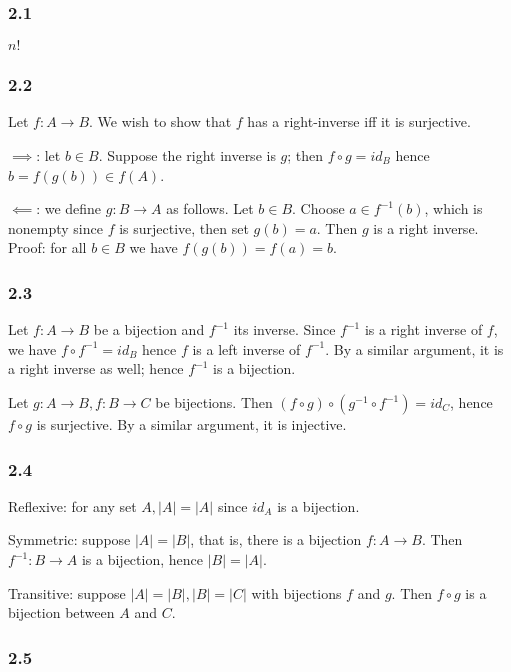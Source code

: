 \documentclass{article}
\begin{document}
\subsubsection*{2.1}

$n!$

\subsubsection*{2.2}

Let $f: A \to B$. We wish to show that $f$ has a right-inverse iff it is surjective.

$\implies$: let $b \in B$. Suppose the right inverse is $g$; then $f \circ g = id_B$ hence $b = f(g(b)) \in f(A)$.

$\impliedby$: we define $g: B \to A$ as follows. Let $b \in B$. Choose $a \in f^{-1}(b)$, which is nonempty since $f$ is surjective, then set $g(b) = a$. Then $g$ is a right inverse. Proof: for all $b \in B$ we have $f(g(b)) = f(a) = b$.

\subsubsection*{2.3}

Let $f: A \to B$ be a bijection and $f^{-1}$ its inverse. Since $f^{-1}$ is a right inverse of $f$, we have $f \circ f^{-1} = id_B$ hence $f$ is a left inverse of $f^{-1}$. By a similar argument, it is a right inverse as well; hence $f^{-1}$ is a bijection.

Let $g: A \to B, f: B \to C$ be bijections. Then $(f \circ g) \circ (g^{-1} \circ f^{-1}) = id_C$, hence $f \circ g$ is surjective. By a similar argument, it is injective.

\subsubsection*{2.4}

Reflexive: for any set $A, |A| = |A|$ since $id_A$ is a bijection.

Symmetric: suppose $|A| = |B|$, that is, there is a bijection $f: A \to B$. Then $f^{-1}: B \to A$ is a bijection, hence $|B| = |A|$.

Transitive: suppose $|A| = |B|, |B| = |C|$ with bijections $f$ and $g$. Then $f \circ g$ is a bijection between $A$ and $C$.

\subsubsection*{2.5}
\end{document}
